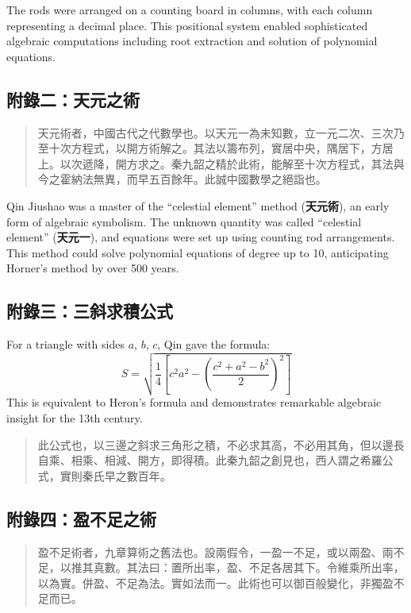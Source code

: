 \documentclass[11pt,a4paper]{article}
\begin{document}
The rods were arranged on a counting board in columns, with each column 
representing a decimal place. This positional system enabled sophisticated 
algebraic computations including root extraction and solution of polynomial 
equations.

\subsection*{附錄二：天元之術}

\begin{quote}
\textcolor{chinacolor}{%
天元術者，中國古代之代數學也。以天元一為未知數，立一元二次、三次乃至十次方程式，以開方術解之。其法以籌布列，實居中央，隅居下，方居上。以次遞降，開方求之。秦九韶之精於此術，能解至十次方程式，其法與今之霍納法無異，而早五百餘年。此誠中國數學之絕詣也。
}
\end{quote}

Qin Jiushao was a master of the ``celestial element'' method (\textbf{天元術}), an early form 
of algebraic symbolism. The unknown quantity was called ``celestial element'' 
(\textbf{天元一}), and equations were set up using counting rod arrangements. 
This method could solve polynomial equations of degree up to 10, anticipating 
Horner's method by over 500 years.

\subsection*{附錄三：三斜求積公式}

For a triangle with sides $a$, $b$, $c$, Qin gave the formula:
\[
S = \sqrt{\frac{1}{4}\left[c^2a^2 - \left(\frac{c^2+a^2-b^2}{2}\right)^2\right]}
\]
This is equivalent to Heron's formula and demonstrates remarkable algebraic 
insight for the 13th century.

\begin{quote}
\textcolor{chinacolor}{%
此公式也，以三邊之斜求三角形之積，不必求其高，不必用其角，但以邊長自乘、相乘、相減、開方，即得積。此秦九韶之創見也，西人謂之希羅公式，實則秦氏早之數百年。
}
\end{quote}

\subsection*{附錄四：盈不足之術}

\begin{quote}
\textcolor{chinacolor}{%
盈不足術者，九章算術之舊法也。設兩假令，一盈一不足，或以兩盈、兩不足，以推其真數。其法曰：置所出率，盈、不足各居其下。令維乘所出率，以為實。併盈、不足為法。實如法而一。此術也可以御百般變化，非獨盈不足而已。
}
\end{quote}
\end{document}
